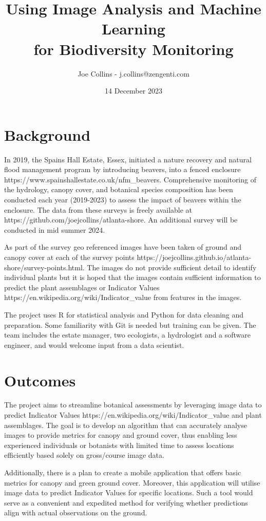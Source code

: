 \documentclass{roles}
\title{Using Image Analysis and Machine Learning\\for Biodiversity Monitoring}
\author{Joe Collins - j.collins@zengenti.com}
\date{14 December 2023}
\begin{document}
\maketitle

\section*{Background}

In 2019, the Spains Hall Estate, Essex, initiated a nature recovery and natural flood management program by introducing beavers, into a fenced enclosure https://www.spainshallestate.co.uk/nfm\_beavers.  Comprehensive monitoring of the hydrology, canopy cover, and botanical species composition has been conducted each year (2019-2023) to assess the impact of beavers within the enclosure.  The data from these surveys is freely available at https://github.com/joejcollins/atlanta-shore.  An additional survey will be conducted in mid summer 2024.

As part of the survey geo referenced images have been taken of ground and canopy cover at each of the survey points https://joejcollins.github.io/atlanta-shore/survey-points.html. The images do not provide sufficient detail to identify individual plants but it is hoped that the images contain sufficient information to predict the plant assemblages or Indicator Values https://en.wikipedia.org/wiki/Indicator_value from features in the images.

The project uses R for statistical analysis and Python for data cleaning and preparation. Some familiarity with Git is needed but training can be given. The team includes the estate manager, two ecologists, a hydrologist and a software engineer, and would welcome input from a data scientist.

\section*{Outcomes}

The project aims to streamline botanical assessments by leveraging image data to predict Indicator Values https://en.wikipedia.org/wiki/Indicator_value and plant assemblages. The goal is to develop an algorithm that can accurately analyse images to provide metrics for canopy and ground cover, thus enabling less experienced individuals or botanists with limited time to assess locations efficiently based solely on gross/course image data.

Additionally, there is a plan to create a mobile application that offers basic metrics for canopy and green ground cover. Moreover, this application will utilise image data to predict Indicator Values for specific locations. Such a tool would serve as a convenient and expedited method for verifying whether predictions align with actual observations on the ground.
\end{document}
